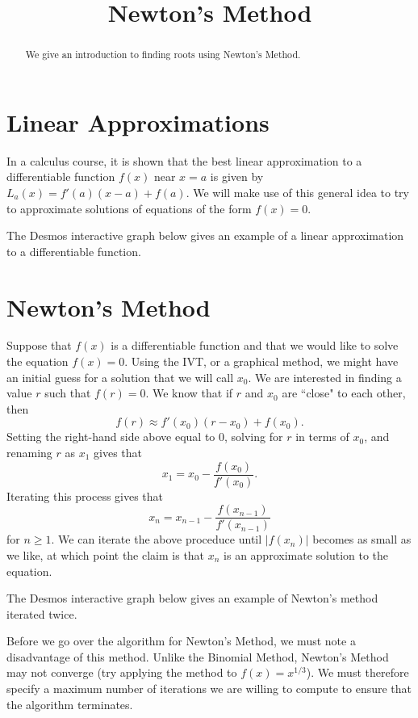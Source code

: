 \documentclass{ximera}
\title{Newton's Method}
\begin{document}
  
\begin{abstract}  
We give an introduction to finding roots using Newton's Method.
\end{abstract}  
\maketitle

\section{Linear Approximations}

In a calculus course, it is shown that the best linear approximation to a differentiable function $f(x)$ near $x=a$ is given by $L_a(x)=f'(a)(x-a)+f(a)$. We will make use of this general idea to try to approximate solutions of equations of the form $f(x)=0$. 

The Desmos interactive graph below gives an example of a linear approximation to a differentiable function.


\section{Newton's Method}

Suppose that $f(x)$ is a differentiable function and that we would like to solve the equation $f(x)=0$. Using the IVT, or a graphical method, we might have an initial guess for a solution that we will call $x_0$. We are interested in finding a value $r$ such that $f(r)=0$. We know that if $r$ and $x_0$ are ``close" to each other, then $$f(r)\approx f'(x_0)(r-x_0)+f(x_0).$$ Setting the right-hand side above equal to 0, solving for $r$ in terms of $x_0$, and renaming $r$ as $x_1$ gives that $$x_1=x_0-\frac{f(x_0)}{f'(x_0)}.$$ Iterating this process gives that $$x_n=x_{n-1}-\frac{f(x_{n-1})}{f'(x_{n-1})}$$ for $n\geq 1$. We can iterate the above proceduce until $|f(x_n)|$ becomes as small as we like, at which point the claim is that $x_n$ is an approximate solution to the equation.

The Desmos interactive graph below gives an example of Newton's method iterated twice.


Before we go over the algorithm for Newton's Method, we must note a disadvantage of this method. Unlike the Binomial Method, Newton's Method may not converge (try applying the method to $f(x)=x^{1/3}$). We must therefore specify a maximum number of iterations we are willing to compute to ensure that the algorithm terminates.
\end{document}
